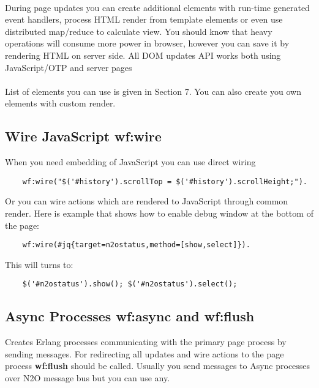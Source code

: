 \paragraph{}
During page updates you can create additional elements with
run-time generated event handlers, process HTML render from
template elements or even use distributed map/reduce to calculate view.
You should know that heavy operations will consume
more power in browser, however you can save it by rendering
HTML on server side. All DOM updates API works both using
JavaScript/OTP and server pages 

\paragraph{}
List of elements you can use is given in Section 7. You can also create
you own elements with custom render.

\newpage
\subsection{Wire JavaScript \bf{wf:wire}}
When you need embedding of JavaScript you can use direct wiring

\vspace{1\baselineskip}
\begin{lstlisting}
    wf:wire("$('#history').scrollTop = $('#history').scrollHeight;").
\end{lstlisting}
\vspace{1\baselineskip}

Or you can wire actions which are rendered to JavaScript
through common render. Here is example that shows how to
enable debug window at the bottom of the page:

\vspace{1\baselineskip}
\begin{lstlisting}
    wf:wire(#jq{target=n2ostatus,method=[show,select]}).
\end{lstlisting}
\vspace{1\baselineskip}

This will turns to:

\vspace{1\baselineskip}
\begin{lstlisting}
    $('#n2ostatus').show(); $('#n2ostatus').select();
\end{lstlisting}

\subsection{Async Processes \bf{wf:async} and \bf{wf:flush}}
Creates Erlang processes communicating with the primary page
process by sending messages. For redirecting all updates and
wire actions to the page process {\bf wf:flush} should be called.
Usually you send messages to Async processes over N2O
message bus but you can use any.

